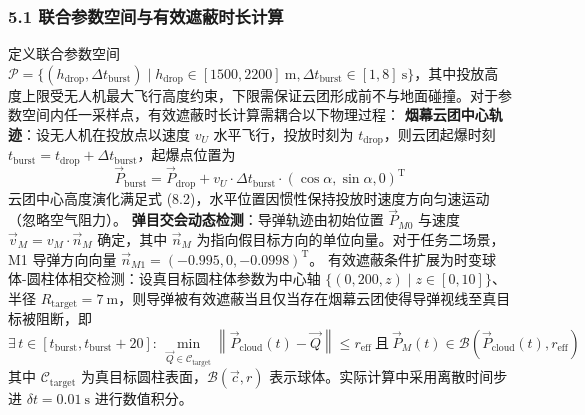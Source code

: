 \documentclass{JXUSTmodeling}
\begin{document}
\subsubsection{5.1 联合参数空间与有效遮蔽时长计算}
定义联合参数空间 $\mathcal{P} = \{(h_{\mathrm{drop}}, \Delta t_{\mathrm{burst}}) \mid h_{\mathrm{drop}} \in [1500, 2200]\ \mathrm{m}, \Delta t_{\mathrm{burst}} \in [1, 8]\ \mathrm{s}\}$，其中投放高度上限受无人机最大飞行高度约束，下限需保证云团形成前不与地面碰撞。对于参数空间内任一采样点，有效遮蔽时长计算需耦合以下物理过程：
\textbf{烟幕云团中心轨迹}：设无人机在投放点以速度 $v_U$ 水平飞行，投放时刻为 $t_{\mathrm{drop}}$，则云团起爆时刻 $t_{\mathrm{burst}} = t_{\mathrm{drop}} + \Delta t_{\mathrm{burst}}$，起爆点位置为
\begin{equation}
\vec{P}_{\mathrm{burst}} = \vec{P}_{\mathrm{drop}} + v_U \cdot \Delta t_{\mathrm{burst}} \cdot (\cos\alpha, \sin\alpha, 0)^{\mathrm{T}} \tag{8.5}
\end{equation}
云团中心高度演化满足式 (8.2)，水平位置因惯性保持投放时速度方向匀速运动（忽略空气阻力）。
\textbf{弹目交会动态检测}：导弹轨迹由初始位置 $\vec{P}_{M0}$ 与速度 $\vec{v}_M = v_M \cdot \vec{n}_M$ 确定，其中 $\vec{n}_M$ 为指向假目标方向的单位向量。对于任务二场景，M1 导弹方向向量 $\vec{n}_{M1} = (-0.995, 0, -0.0998)^{\mathrm{T}}$。
有效遮蔽条件扩展为时变球体-圆柱体相交检测：设真目标圆柱体参数为中心轴 $\{(0, 200, z) \mid z \in [0, 10]\}$、半径 $R_{\mathrm{target}} = 7\ \mathrm{m}$，则导弹被有效遮蔽当且仅当存在烟幕云团使得导弹视线至真目标被阻断，即
\begin{equation}
\exists\, t \in [t_{\mathrm{burst}}, t_{\mathrm{burst}}+20]:\ \min_{\vec{Q} \in \mathcal{C}_{\mathrm{target}}} \left\| \vec{P}_{\mathrm{cloud}}(t) - \vec{Q} \right\| \leq r_{\mathrm{eff}}\ \text{且}\ \vec{P}_M(t) \in \mathcal{B}(\vec{P}_{\mathrm{cloud}}(t), r_{\mathrm{eff}}) \tag{8.6}
\end{equation}
其中 $\mathcal{C}_{\mathrm{target}}$ 为真目标圆柱表面，$\mathcal{B}(\vec{c}, r)$ 表示球体。实际计算中采用离散时间步进 $\delta t = 0.01\ \mathrm{s}$ 进行数值积分。
\end{document}
